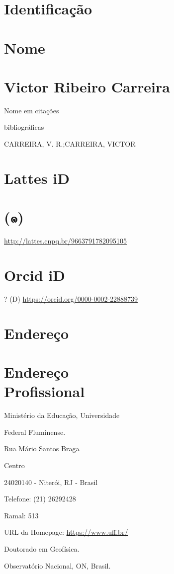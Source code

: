\documentclass[10pt]{article}
\begin{document}
\section*{Identificação}
\section*{Nome}
\section*{Victor Ribeiro Carreira}
Nome em citações

bibliográficas

CARREIRA, V. R.;CARREIRA, VICTOR

\section*{Lattes iD}
\section*{(๑)}
\href{http://lattes.cnpq.br/9663791782095105}{http://lattes.cnpq.br/9663791782095105}

\section*{Orcid iD}
? (D) \href{https://orcid.org/0000-0002-22888739}{https://orcid.org/0000-0002-22888739}

\section*{Endereço}
\section*{Endereço \\
 Profissional}
Ministério da Educação, Universidade

Federal Fluminense.

Rua Mário Santos Braga

Centro

24020140 - Niterói, RJ - Brasil

Telefone: (21) 26292428

Ramal: 513

URL da Homepage: \href{https://www.uff.br/}{https://www.uff.br/}

Doutorado em Geofísica.

Observatório Nacional, ON, Brasil.
\end{document}
